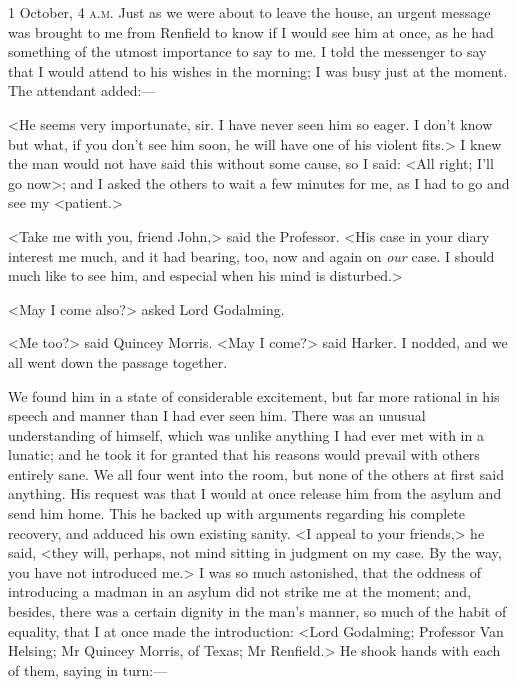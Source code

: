 \begin{diary}{1 October, 4 \textsc{a.m.}}
Just as we were about to leave the house, an urgent message was brought to me from Renfield to know if I would see him at once, as he had something of the utmost importance to say to me. I told the messenger to say that I would attend to his wishes in the morning; I was busy just at the moment. The attendant added:—

<He seems very importunate, sir. I have never seen him so eager. I don't know but what, if you don't see him soon, he will have one of his violent fits.> I knew the man would not have said this without some cause, so I said: <All right; I'll go now>; and I asked the others to wait a few minutes for me, as I had to go and see my <patient.>

<Take me with you, friend John,> said the Professor. <His case in your diary interest me much, and it had bearing, too, now and again on \textit{our} case. I should much like to see him, and especial when his mind is disturbed.>

<May I come also?> asked Lord Godalming.

<Me too?> said Quincey Morris. <May I come?> said Harker. I nodded, and we all went down the passage together.

We found him in a state of considerable excitement, but far more rational in his speech and manner than I had ever seen him. There was an unusual understanding of himself, which was unlike anything I had ever met with in a lunatic; and he took it for granted that his reasons would prevail with others entirely sane. We all four went into the room, but none of the others at first said anything. His request was that I would at once release him from the asylum and send him home. This he backed up with arguments regarding his complete recovery, and adduced his own existing sanity. <I appeal to your friends,> he said, <they will, perhaps, not mind sitting in judgment on my case. By the way, you have not introduced me.> I was so much astonished, that the oddness of introducing a madman in an asylum did not strike me at the moment; and, besides, there was a certain dignity in the man's manner, so much of the habit of equality, that I at once made the introduction: <Lord Godalming; Professor Van Helsing; Mr Quincey Morris, of Texas; Mr Renfield.> He shook hands with each of them, saying in turn:—


\end{diary}
